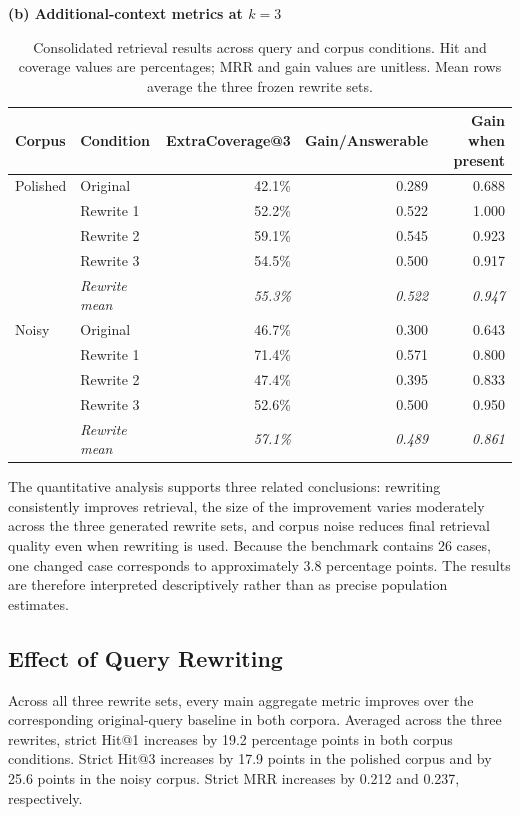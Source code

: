 \begin{table}[htbp]
\vspace{0.8em}
\textbf{(b) Additional-context metrics at $k=3$}\\[0.35em]
\begin{tabular}{@{}llrrr@{}}
\toprule
\textbf{Corpus} & \textbf{Condition} & \textbf{ExtraCoverage@3} & \textbf{Gain/Answerable} & \textbf{Gain when present} \\
\midrule
Polished & Original & 42.1\% & 0.289 & 0.688 \\
& Rewrite 1 & 52.2\% & 0.522 & 1.000 \\
& Rewrite 2 & 59.1\% & 0.545 & 0.923 \\
& Rewrite 3 & 54.5\% & 0.500 & 0.917 \\
& \emph{Rewrite mean} & \emph{55.3\%} & \emph{0.522} & \emph{0.947} \\
\midrule
Noisy & Original & 46.7\% & 0.300 & 0.643 \\
& Rewrite 1 & 71.4\% & 0.571 & 0.800 \\
& Rewrite 2 & 47.4\% & 0.395 & 0.833 \\
& Rewrite 3 & 52.6\% & 0.500 & 0.950 \\
& \emph{Rewrite mean} & \emph{57.1\%} & \emph{0.489} & \emph{0.861} \\
\bottomrule
\end{tabular}
\caption{Consolidated retrieval results across query and corpus conditions. Hit and coverage values are percentages; MRR and gain values are unitless. Mean rows average the three frozen rewrite sets.}
\label{tab:results-consolidated}
\end{table}

The quantitative analysis supports three related conclusions: rewriting consistently improves retrieval, the size of the improvement varies moderately across the three generated rewrite sets, and corpus noise reduces final retrieval quality even when rewriting is used. Because the benchmark contains 26 cases, one changed case corresponds to approximately 3.8 percentage points. The results are therefore interpreted descriptively rather than as precise population estimates.

\subsection{Effect of Query Rewriting}

Across all three rewrite sets, every main aggregate metric improves over the corresponding original-query baseline in both corpora. Averaged across the three rewrites, strict Hit@1 increases by 19.2 percentage points in both corpus conditions. Strict Hit@3 increases by 17.9 points in the polished corpus and by 25.6 points in the noisy corpus. Strict MRR increases by 0.212 and 0.237, respectively.

